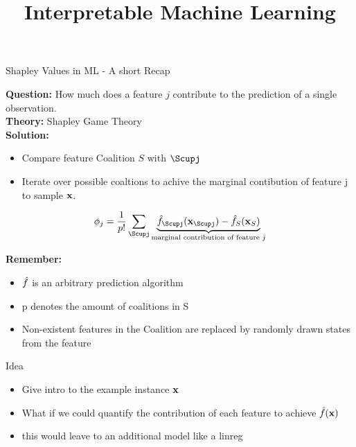 \documentclass[10pt,compress,t,notes=noshow, xcolor=table]{beamer}
\title{Interpretable Machine Learning}
\date{}
\begin{document}



\begin{vbframe}{Shapley Values in ML - A short Recap}
  
  \textbf{Question:} How much does a feature $j$ contribute to the prediction of a single observation. \\
  \textbf{Theory:} Shapley Game Theory \\
  \textbf{Solution:} 
  \begin{itemize}
    \item Compare feature Coalition $S$ with $\Scupj$ 
    \item Iterate over possible coaltions to achive the marginal contibution of feature j to sample $\mathbf{x}$. 
\end{itemize}

     $$ \phi_j  = \frac{1}{p!} \sum_{\Scupj} \underbrace{\fh_{\Scupj}(\xv_{\Scupj}) - \fh_{S}(\xv_{S})}_{\text{marginal contribution of feature $j$}} $$

\textbf{Remember:}

\begin{itemize}
    \item $\hat{f}$ is an arbitrary prediction algorithm
    \item p denotes the amount of coalitions in S
    \item Non-existent features in the Coalition are replaced by randomly drawn states from the feature
\end{itemize}

\end{vbframe}

\begin{vbframe}{Idea}

\begin{itemize}
    \item Give intro to the example instance $\mathbf{x}$
    \item What if we could quantify the contribution of each feature to achieve $\hat{f}(\mathbf{x})$
    \item this would leave to an additional model like a linreg
\end{itemize}


\end{vbframe}
\end{document}
